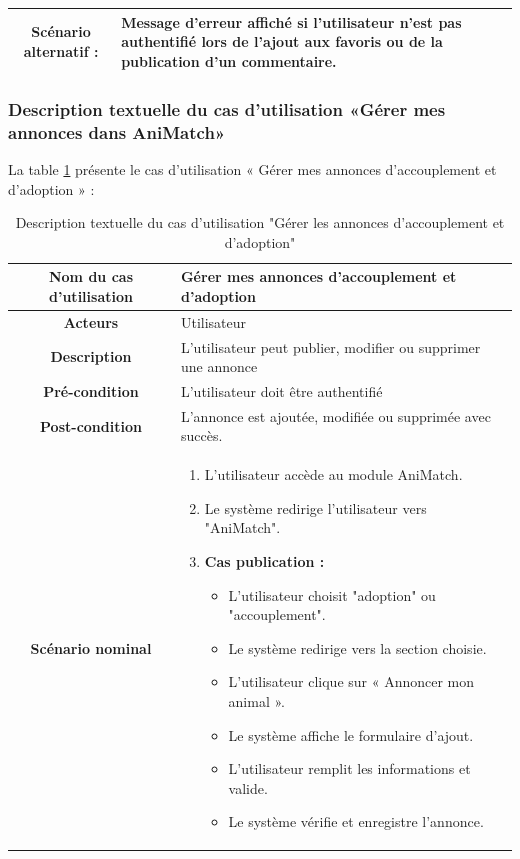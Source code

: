 \begin{longtable}{|c|p{11cm}|}
\hline
\cellcolor{coloranimatch} \textbf{Scénario alternatif :} &
Message d’erreur affiché si l’utilisateur n’est pas authentifié lors de l’ajout aux favoris ou de la publication d’un commentaire. \\
\hline

\end{longtable}


\newpage 
\subsubsection{Description textuelle du cas d’utilisation «Gérer mes annonces dans AniMatch»} 
La table \ref{tab:gerer_annonces_global} présente le cas d’utilisation « Gérer mes  annonces d’accouplement et d’adoption » : 
\begin{longtable}{|c|p{11cm}|}
\caption{Description textuelle du cas d'utilisation "Gérer les annonces d’accouplement et d’adoption"}
\label{tab:gerer_annonces_global} \\
\hline
\cellcolor{coloranimatch}\textbf{Nom du cas d'utilisation } & Gérer mes annonces d’accouplement et d’adoption \\
\hline
\cellcolor{coloranimatch}\textbf{Acteurs} & Utilisateur \\
\hline
\cellcolor{coloranimatch}\textbf{Description } & L’utilisateur peut publier, modifier ou supprimer une annonce \\
\hline
\cellcolor{coloranimatch}\textbf{Pré-condition } & L’utilisateur doit être authentifié  \\
\hline
\cellcolor{coloranimatch}\textbf{Post-condition } & L’annonce est ajoutée, modifiée ou supprimée avec succès. \\
\hline

\cellcolor{coloranimatch}\textbf{Scénario nominal } &
\begin{enumerate}
\item L’utilisateur accède au module AniMatch.
\item Le système redirige l’utilisateur vers "AniMatch".

\item \textbf{Cas publication :}
\begin{itemize}
\item L’utilisateur choisit "adoption" ou "accouplement".
\item Le système redirige vers la section choisie.
\item L’utilisateur clique sur « Annoncer mon animal ».
\item Le système affiche le formulaire d’ajout.
\item L’utilisateur remplit les informations et valide.
\item Le système vérifie et enregistre l’annonce.
\end{itemize}


\end{enumerate}
\end{longtable}
